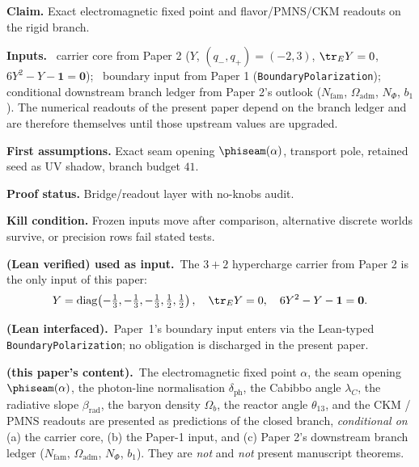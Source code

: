\begin{tfptclaimcontract}
\textbf{Claim.} Exact electromagnetic fixed point and flavor/PMNS/CKM readouts on the rigid branch.\par
\textbf{Inputs.}\
 carrier core from Paper 2
($Y$, $(q_-,q_+)=(-2,3)$, $\tr_E Y = 0$, $6Y^2-Y-\mathbf 1 = \mathbf 0$);\
 boundary input from Paper 1 (\texttt{BoundaryPolarization});\
 conditional downstream branch ledger from Paper 2's
 outlook ($N_{\mathrm{fam}}$, $\Omega_{\mathrm{adm}}$,
$N_\Phi$, $b_1$). The numerical readouts of the present paper
depend on the \stag{C} branch ledger and are therefore
themselves \stag{C} until those upstream values are upgraded.\par
\textbf{First assumptions.} Exact seam opening $\phiseam(\alpha)$, transport pole, retained seed as UV shadow, branch budget $41$.\par
\textbf{Proof status.} Bridge/readout layer with no-knobs audit.\par
\textbf{Kill condition.} Frozen inputs move after comparison, alternative discrete worlds survive, or precision rows fail stated tests.\par
\end{tfptclaimcontract}

\begin{tfptstatusbox}
\textbf{ (Lean verified) used as input.}\ The $3+2$
hypercharge carrier from Paper 2 is the only  input of
this paper:
\[
Y = \operatorname{diag}\!\left(-\tfrac13,-\tfrac13,-\tfrac13,\tfrac12,\tfrac12\right),
\quad
\tr_E Y = 0,
\quad
6 Y^2 - Y - \mathbf 1 = \mathbf 0.
\]

\smallskip
\textbf{ (Lean interfaced).}\ Paper~1's boundary input
enters via the Lean-typed \texttt{BoundaryPolarization}; no
\stag{I} obligation is discharged in the present paper.

\smallskip
\textbf{\stag{C} (this paper's content).}\ The electromagnetic
fixed point $\alpha$, the seam opening $\phiseam(\alpha)$, the
photon-line normalisation $\delta_{\mathrm{ph}}$, the Cabibbo
angle $\lambda_C$, the radiative slope $\beta_{\mathrm{rad}}$,
the baryon density $\Omega_b$, the reactor angle $\theta_{13}$,
and the CKM / PMNS readouts are presented as predictions of
the closed branch, \emph{conditional on} (a) the 
carrier core, (b) the \stag{I} Paper-1 input, and (c) Paper 2's
\stag{C} downstream branch ledger
($N_{\mathrm{fam}}$, $\Omega_{\mathrm{adm}}$, $N_\Phi$, $b_1$).
They are \emph{not} \stag{L} and \emph{not} present manuscript
\stag{M} theorems.
\end{tfptstatusbox}

